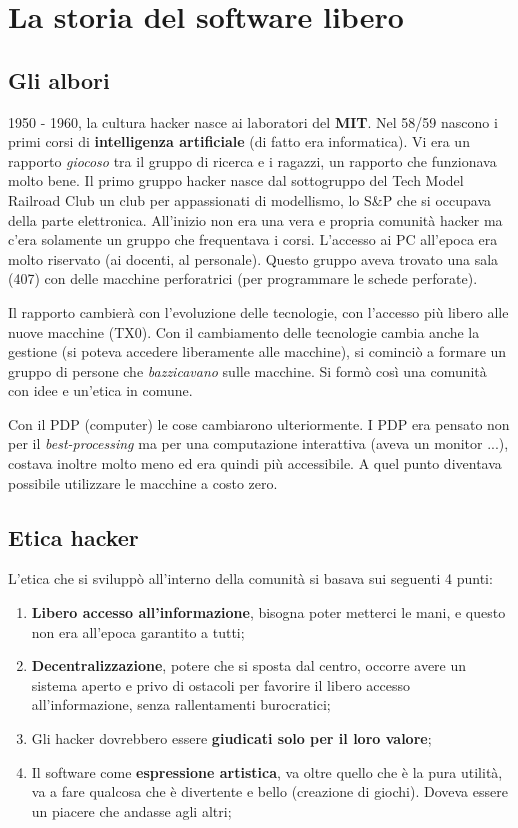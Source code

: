 \chapter{La storia del software libero}


\section{Gli albori}

1950 - 1960, la cultura hacker nasce ai laboratori del \textbf{MIT}. Nel 58/59 nascono i primi corsi di \textbf{intelligenza artificiale} (di fatto era informatica). Vi era un rapporto \textit{giocoso} tra il gruppo di ricerca e i ragazzi, un rapporto che funzionava molto bene. Il primo gruppo hacker nasce dal sottogruppo del Tech Model Railroad Club un club per appassionati di modellismo, lo S\&P che si occupava della parte elettronica. All'inizio non era una vera e propria comunità hacker ma c'era solamente un gruppo che frequentava i corsi. L'accesso ai PC all'epoca era molto riservato (ai docenti, al personale). Questo gruppo aveva trovato una sala (407) con delle macchine perforatrici (per programmare le schede perforate). 

Il rapporto cambierà con l'evoluzione delle tecnologie, con l'accesso più libero alle nuove macchine (TX0). Con il cambiamento delle tecnologie cambia anche la gestione (si poteva accedere liberamente alle macchine), si cominciò a formare un gruppo di persone che \textit{bazzicavano} sulle macchine. Si formò così una comunità con idee e un'etica in comune. 

Con il PDP (computer) le cose cambiarono ulteriormente. I PDP era pensato non per il \textit{best-processing} ma per una computazione interattiva (aveva un monitor ...), costava inoltre molto meno ed era quindi più accessibile. A quel punto diventava possibile utilizzare le macchine a costo zero.

\section{Etica hacker}

L'etica che si sviluppò all'interno della comunità si basava sui seguenti 4 punti:

\begin{enumerate}

\item \textbf{Libero accesso all'informazione}, bisogna poter metterci le mani, e questo non era all'epoca garantito a tutti;
\item \textbf{Decentralizzazione}, potere che si sposta dal centro, occorre avere un sistema aperto e privo di ostacoli per favorire il libero accesso all'informazione, senza rallentamenti burocratici;
\item Gli hacker dovrebbero essere \textbf{giudicati solo per il loro valore};
\item Il software come \textbf{espressione artistica}, va oltre quello che è la pura utilità, va a fare qualcosa che è divertente e bello (creazione di giochi). Doveva essere un piacere che andasse agli altri;

\end{enumerate}

